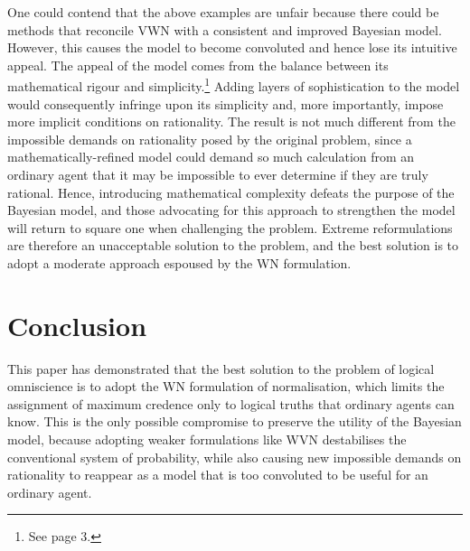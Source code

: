 \documentclass[12pt]{article}
\begin{document}
One could contend that the above examples are unfair because there could be methods that reconcile VWN with a consistent and improved Bayesian model. However, this causes the model to become convoluted and hence lose its intuitive appeal. The appeal of the model comes from the balance between its mathematical rigour and simplicity.\footnote{See page 3.} Adding layers of sophistication to the model would consequently infringe upon its simplicity and, more importantly, impose more implicit conditions on rationality. The result is not much different from the impossible demands on rationality posed by the original problem, since a mathematically-refined model could demand so much calculation from an ordinary agent that it may be impossible to ever determine if they are truly rational. Hence, introducing mathematical complexity defeats the purpose of the Bayesian model, and those advocating for this approach to strengthen the model will return to square one when challenging the problem. Extreme reformulations are therefore an unacceptable solution to the problem, and the best solution is to adopt a moderate approach espoused by the WN formulation.
\section{Conclusion}
This paper has demonstrated that the best solution to the problem of logical omniscience is to adopt the WN formulation of normalisation, which limits the assignment of maximum credence only to logical truths that ordinary agents can know. This is the only possible compromise to preserve the utility of the Bayesian model, because adopting weaker formulations like WVN destabilises the conventional system of probability, while also causing new impossible demands on rationality to reappear as a model that is too convoluted to be useful for an ordinary agent.
\pagebreak
\printbibliography
\end{document}
